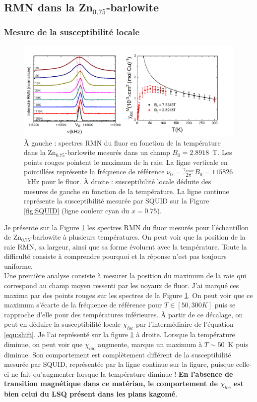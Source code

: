 \subsection{RMN dans la Zn$_{0.75}$-barlowite}
\label{Résultats}
\subsubsection{Mesure de la susceptibilité locale }
\begin{figure}[!h]
\centering
\includegraphics[scale=0.45]{Fig6.png}
\caption{\label{fig:Fluor}\`{A} gauche : spectres RMN du fluor en fonction de la température dans la Zn$_{0.75}$-barlowite mesurés dans un champ $B_0=2.8918$~T. Les points rouges pointent le maximum de la raie. La ligne verticale en pointillées représente la fréquence de référence $\nu_{0}=\frac{\gamma_{Fluor}}{2\pi}B_0=115826$~kHz pour le fluor. \`{A} droite : susceptibilité locale déduite des mesures de gauche en fonction de la température. La ligne continue représente la susceptibilité mesurée par SQUID sur la Figure \ref{fig:SQUID} (ligne couleur cyan  du $x=0.75$).}
\end{figure}
Je présente sur la Figure \ref{fig:Fluor} les spectres RMN du fluor mesurés pour l'échantillon de Zn$_{0.75}$-barlowite à plusieurs températures. On peut voir que la position de la raie RMN, sa largeur, ainsi que sa forme évoluent avec la température. Toute la difficulté consiste à comprendre pourquoi et la réponse n'est pas toujours uniforme.\\
Une première analyse consiste à mesurer la position du maximum de la raie qui correspond au champ moyen ressenti par les noyaux de fluor. J'ai marqué ces maxima par des points rouges sur les spectres de la Figure \ref{fig:Fluor}. On peut voir que ce maximum s'écarte de la fréquence de référence pour $T\in[50,300K]$ puis se rapproche d'elle pour des températures inférieures. \`{A} partir de ce décalage, on peut en déduire la susceptibilité locale $\chi_{loc}$ par l'intermédiaire de l'équation \ref{equ:shift}. Je l'ai représenté sur la figure \ref{fig:Fluor} à droite. Lorsque la température diminue, on peut voir que $\chi_{loc}$ augmente, marque un maximum à $T\sim50$~K puis diminue. Son comportement est complètement différent de la susceptibilité mesurée par SQUID, représentée par la ligne continue sur la figure, puisque celle-ci ne fait qu'augmenter lorsque la température diminue ! \textbf{En l'absence de transition magnétique dans ce matériau, le comportement de $\chi_{loc}$ est bien celui du LSQ présent dans les plans kagomé}.
